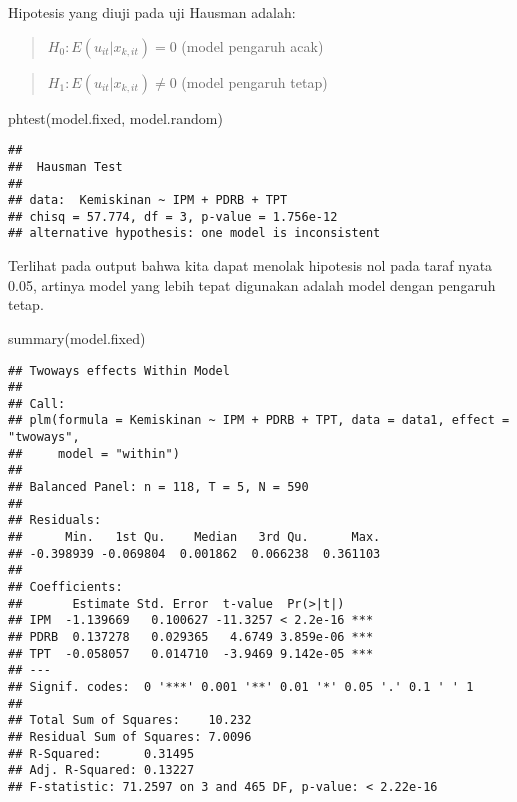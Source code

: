 \documentclass[
]{book}
\newenvironment{Shaded}{\begin{snugshade}}{\end{snugshade}}
\newcommand{\FunctionTok}[1]{\textcolor[rgb]{0.00,0.00,0.00}{#1}}
\newcommand{\NormalTok}[1]{#1}
\begin{document}
Hipotesis yang diuji pada uji Hausman adalah:

\begin{quote}
\(H_0: E(u_{it}|x_{k, it})=0\) (model pengaruh acak)
\end{quote}

\begin{quote}
\(H_1: E(u_{it}|x_{k, it}) \ne 0\) (model pengaruh tetap)
\end{quote}

\begin{Shaded}
\begin{Highlighting}[]
\FunctionTok{phtest}\NormalTok{(model.fixed, model.random)}
\end{Highlighting}
\end{Shaded}

\begin{verbatim}
## 
##  Hausman Test
## 
## data:  Kemiskinan ~ IPM + PDRB + TPT
## chisq = 57.774, df = 3, p-value = 1.756e-12
## alternative hypothesis: one model is inconsistent
\end{verbatim}

Terlihat pada output bahwa kita dapat menolak hipotesis nol pada taraf nyata 0.05, artinya model yang lebih tepat digunakan adalah model dengan pengaruh tetap.

\begin{Shaded}
\begin{Highlighting}[]
\FunctionTok{summary}\NormalTok{(model.fixed)}
\end{Highlighting}
\end{Shaded}

\begin{verbatim}
## Twoways effects Within Model
## 
## Call:
## plm(formula = Kemiskinan ~ IPM + PDRB + TPT, data = data1, effect = "twoways", 
##     model = "within")
## 
## Balanced Panel: n = 118, T = 5, N = 590
## 
## Residuals:
##      Min.   1st Qu.    Median   3rd Qu.      Max. 
## -0.398939 -0.069804  0.001862  0.066238  0.361103 
## 
## Coefficients:
##       Estimate Std. Error  t-value  Pr(>|t|)    
## IPM  -1.139669   0.100627 -11.3257 < 2.2e-16 ***
## PDRB  0.137278   0.029365   4.6749 3.859e-06 ***
## TPT  -0.058057   0.014710  -3.9469 9.142e-05 ***
## ---
## Signif. codes:  0 '***' 0.001 '**' 0.01 '*' 0.05 '.' 0.1 ' ' 1
## 
## Total Sum of Squares:    10.232
## Residual Sum of Squares: 7.0096
## R-Squared:      0.31495
## Adj. R-Squared: 0.13227
## F-statistic: 71.2597 on 3 and 465 DF, p-value: < 2.22e-16
\end{verbatim}
\end{document}
